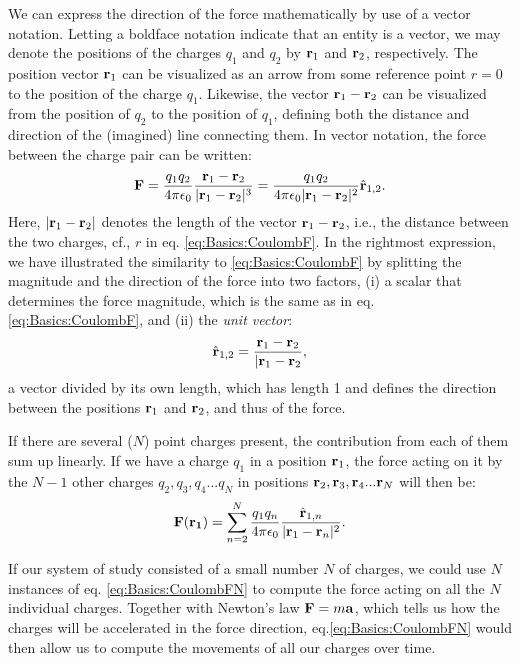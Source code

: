 We can express the direction of the force mathematically by use of a vector notation. Letting a boldface notation indicate that an entity is a vector, we may denote the positions of the charges $q_1$ and $q_2$ by ${\bf r}_1$ and ${\bf r}_2$, respectively. The position vector ${\bf r}_1$ can be visualized as an arrow from some reference point $r=0$ to the position of the charge $q_1$. Likewise, the vector ${\bf r}_1-{\bf r}_2$ can be visualized from the position of $q_2$ to the position of $q_1$, defining both the distance and direction of the (imagined) line connecting them. In vector notation, the force between the charge pair can be written:
\begin{equation}
{\bf F} = \frac{q_1 q_2}{4\pi \epsilon_0}  \frac{{\bf r}_1-{\bf r}_2}{|{\bf r}_1-{\bf r}_2|^3} =\frac{q_1q_2}{4\pi \epsilon_0 |{\bf r}_1-{\bf r}_2|^2} \hat{{\bf r}}_{1,2}.
\label{eq:Basics:CoulombFvec}
\end{equation}
Here, $|{\bf r}_1-{\bf r}_2|$ denotes the length of the vector ${\bf r}_1-{\bf r}_2$, i.e., the distance between the two charges, cf., $r$ in eq. \ref{eq:Basics:CoulombF}. In the rightmost expression, we have illustrated the similarity to \ref{eq:Basics:CoulombF} by splitting the magnitude and the direction of the force into two factors, (i) a scalar that determines the force magnitude, which is the same as in eq. \ref{eq:Basics:CoulombF}, and (ii) the  \textit{unit vector}:
\begin{equation}
\hat{{\bf r}}_{1,2} = \frac{{\bf r}_1 - {\bf r}_2}{|{\bf r}_1-{\bf r}_2}, 
\label{eq:Basics:UnitVector}
\end{equation}
a vector divided by its own length, which has length 1 and defines the direction between the positions ${\bf r}_1$ and ${\bf r}_2$,  and thus of the force. 

If there are several ($N$) point charges present, the contribution from each of them sum up linearly. If we have a charge $q_1$ in a position ${\bf r}_1$, the force acting on it by the $N-1$ other charges $q_2, q_3, q_4 ... q_{N}$ in positions ${\bf r}_2, {\bf r}_3, {\bf r}_4 ... {\bf r}_{N}$ will then be:
\begin{equation}
{\bf F}({\bf r_1}) = \sum_{n=2}^{N} \frac{q_1 q_n}{4\pi \epsilon_0} \frac{\hat{{\bf r}}_{1,n}}{|{\bf r}_1-{\bf r}_n|^2}.
\label{eq:Basics:CoulombFN}
\end{equation}

If our system of study consisted of a small number $N$ of charges, we could use $N$ instances of eq. \ref{eq:Basics:CoulombFN} to compute the force acting on all the $N$ individual charges. Together with Newton's law ${\bf F} = m {\bf a}$, which tells us how the charges will be accelerated in the force direction, eq.\ref{eq:Basics:CoulombFN} would then allow us to compute the movements of all our charges over time. 

